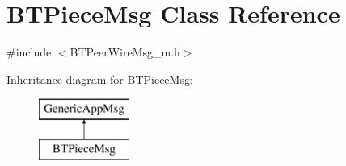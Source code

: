 \hypertarget{classBTPieceMsg}{}\section{B\+T\+Piece\+Msg Class Reference}
\label{classBTPieceMsg}


{\ttfamily \#include $<$B\+T\+Peer\+Wire\+Msg\+\_\+m.\+h$>$}

Inheritance diagram for B\+T\+Piece\+Msg\+:\begin{figure}[H]
\begin{center}
\leavevmode
\includegraphics[height=2.000000cm]{classBTPieceMsg}
\end{center}
\end{figure}
